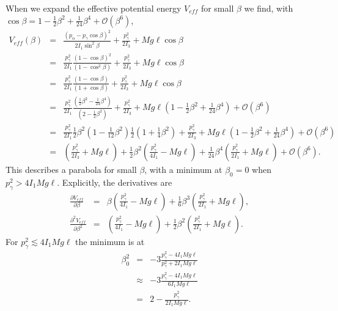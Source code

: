\documentclass[letterpaper,11pt]{article}
\begin{document}
When we expand the effective potential energy $V_{eff}$ for small $\beta$ we find, with $\cos\beta = 1 - \frac{1}{2}\beta^2 + \frac{1}{24}\beta^4 + \mathcal{O}(\beta^6)$,
\begin{eqnarray*}
 V_{eff}(\beta) & = & \frac{(p_\alpha - p_\gamma\cos\beta)^2}{2 I_1 \sin^2\beta} + \frac{p^2_\gamma}{2 I_3} + Mg\ell \cos\beta \\
 & = & \frac{p_\gamma^2}{2 I_1} \frac{(1 - \cos\beta)^2}{(1 - \cos^2\beta)} + \frac{p^2_\gamma}{2 I_3} + Mg\ell \cos\beta \\
 & = & \frac{p_\gamma^2}{2 I_1} \frac{(1 - \cos\beta)}{(1 + \cos\beta)} + \frac{p^2_\gamma}{2 I_3} + Mg\ell \cos\beta \\
 & = & \frac{p_\gamma^2}{2 I_1} \frac{(\frac{1}{2}\beta^2 - \frac{1}{24}\beta^4)}{(2 - \frac{1}{2}\beta^2)} + \frac{p^2_\gamma}{2 I_3} + Mg\ell \left( 1 - \frac{1}{2}\beta^2 + \frac{1}{24}\beta^4 \right) + \mathcal{O}(\beta^6) \\
 & = & \frac{p_\gamma^2}{2 I_1} \frac{1}{2}\beta^2 (1 - \frac{1}{12}\beta^2) \frac{1}{2} (1 + \frac{1}{4}\beta^2) + \frac{p^2_\gamma}{2 I_3} + Mg\ell \left( 1 - \frac{1}{2}\beta^2 + \frac{1}{24}\beta^4 \right) + \mathcal{O}(\beta^6) \\
 & = & \left(\frac{p^2_\gamma}{2 I_3} + Mg\ell\right) + \frac{1}{2}\beta^2 \left(\frac{p^2_\gamma}{4 I_1} - Mg\ell\right) + \frac{1}{24}\beta^4 \left(\frac{p^2_\gamma}{2 I_1} + Mg\ell\right) + \mathcal{O}(\beta^6).
\end{eqnarray*}
This describes a parabola for small $\beta$, with a minimum at $\beta_0 = 0$ when $p_\gamma^2 > 4 I_1 Mg\ell$.  Explicitly, the derivatives are
\begin{eqnarray*}
 \frac{\partial V_{eff}}{\partial \beta} & = & \beta \left(\frac{p^2_\gamma}{4 I_1} - Mg\ell\right) + \frac{1}{6}\beta^3\left(\frac{p^2_\gamma}{2 I_1} + Mg\ell\right), \\
 \frac{\partial^2 V_{eff}}{\partial \beta^2} & = & \left(\frac{p^2_\gamma}{4 I_1} - Mg\ell\right) + \frac{1}{2}\beta^2\left(\frac{p^2_\gamma}{2 I_1} + Mg\ell\right).
\end{eqnarray*}
For $p_\gamma^2 \lesssim 4 I_1 Mg\ell$ the minimum is at
\begin{eqnarray*}
 \beta_0^2 & = & -3\frac{p_\gamma^2 - 4 I_1 Mg\ell}{p_\gamma^2 + 2 I_1 Mg\ell} \\
 & \approx & -3\frac{p_\gamma^2 - 4 I_1 Mg\ell}{6 I_1 Mg\ell} \\
 & = & 2 - \frac{p_\gamma^2}{2 I_1 Mg\ell}.
\end{eqnarray*}
\end{document}
